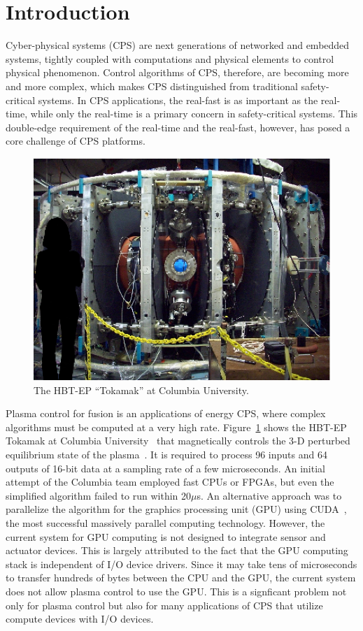 \section{Introduction}
\label{sec:introduction}

Cyber-physical systems (CPS) are next generations of networked and
embedded systems, tightly coupled with computations and physical
elements to control physical phenomenon.
Control algorithms of CPS, therefore, are becoming more and more
complex, which makes CPS distinguished from traditional safety-critical
systems.
In CPS applications, the real-fast is as important as the real-time,
while only the real-time is a primary concern in safety-critical systems. 
This double-edge requirement of the real-time and the real-fast,
however, has posed a core challenge of CPS platforms.

\begin{figure}[tb]
 \centering
 \includegraphics[width=0.8\hsize]{eps/tokamak.eps}
 \caption{The HBT-EP ``Tokamak'' at Columbia University.}
 \label{fig:tokamak}
\end{figure}

Plasma control for fusion is an applications of energy CPS, where
complex algorithms must be computed at a very high rate.
Figure~\ref{fig:tokamak} shows the HBT-EP Tokamak at Columbia
University~\cite{Maurer_PPCF11,Rath_FED12} that magnetically controls
the 3-D perturbed equilibrium state of the plasma~\cite{Boozer_PP99}.
It is required to process 96 inputs and 64 outputs of 16-bit data at a
sampling rate of a few microseconds.
An initial attempt of the Columbia team employed fast CPUs or FPGAs, but
even the simplified algorithm failed to run within 20$\mu$s.
An alternative approach was to parallelize the algorithm for the
graphics processing unit (GPU) using CUDA~\cite{CUDA}, the most
successful massively parallel computing technology.
However, the current system for GPU computing is not designed to
integrate sensor and actuator devices.
This is largely attributed to the fact that the GPU computing stack is
independent of I/O device drivers.
Since it may take tens of microseconds to transfer hundreds of bytes
between the CPU and the GPU, the current system does not allow plasma
control to use the GPU.
This is a signficant problem not only for plasma control but also for
many applications of CPS that utilize compute devices with I/O devices.


